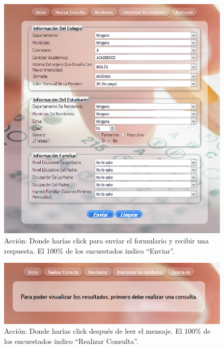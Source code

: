 \begin{figure}[!htb]
\begin{centering}
\includegraphics[scale=0.5]{consultar}
\par\end{centering}
\caption{Acción: Donde harías click para enviar el formulario y recibir una respuesta. El 100\% de los encuestados indico ``Enviar''.}
\label{fig:figura6}
\end{figure}
\begin{figure}[!htb]
\begin{centering}
\includegraphics[scale=0.5]{resultado}
\par\end{centering}
\caption{Acción: Donde harías click después de leer el mensaje. El 100\% de los encuestados indico ``Realizar Consulta''.}
\label{fig:figura7}
\end{figure}
